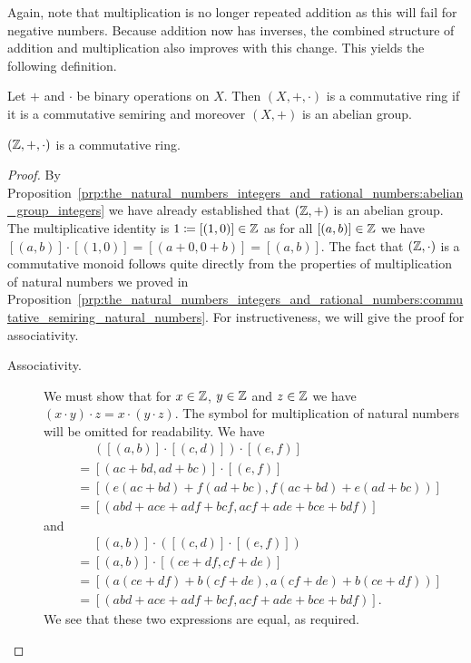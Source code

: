 \documentclass[../main.tex]{subfiles}
\begin{document}
Again, note that multiplication is no longer repeated addition as this will fail for negative numbers. Because addition now has inverses, the combined structure of addition and multiplication also improves with this change. This yields the following definition.
\begin{definition}
    Let $+$ and $\cdot$ be binary operations on $X$. Then $(X,+,\cdot)$ is a commutative ring if it is a commutative semiring and moreover $(X,+)$ is an abelian group.
\end{definition}
\begin{proposition}\label{prp:the_natural_numbers_integers_and_rational_numbers:commutative_ring_integers}
    $(\mathbb{Z},+,\cdot)$ is a commutative ring.
\end{proposition}
\begin{proof}
    By Proposition~\ref{prp:the_natural_numbers_integers_and_rational_numbers:abelian_group_integers} we have already established that $(\mathbb{Z},+)$ is an abelian group. The multiplicative identity is $1\coloneq[(1,0)]\in\mathbb{Z}$ as for all $[(a,b)]\in\mathbb{Z}$ we have $[(a,b)]\cdot[(1,0)]=[(a+0,0+b)]=[(a,b)]$. The fact that $(\mathbb{Z},\cdot)$ is a commutative monoid follows quite directly from the properties of multiplication of natural numbers we proved in Proposition~\ref{prp:the_natural_numbers_integers_and_rational_numbers:commutative_semiring_natural_numbers}. For instructiveness, we will give the proof for associativity.
    \begin{description}
        \item[Associativity.] We must show that for $x\in\mathbb{Z}$, $y\in\mathbb{Z}$ and $z\in\mathbb{Z}$ we have $(x\cdot y)\cdot z=x\cdot(y\cdot z)$. The symbol for multiplication of natural numbers will be omitted for readability. We have
        \begin{align*}
            & \phantom{{}={}}([(a,b)]\cdot[(c,d)])\cdot[(e,f)] \\
            & =[(ac+bd,ad+bc)]\cdot[(e,f)] \\
            & =[(e(ac+bd)+f(ad+bc),f(ac+bd)+e(ad+bc))] \\
            & =[(abd+ace+adf+bcf,acf+ade+bce+bdf)]
        \end{align*}
        and
        \begin{align*}
            & \phantom{{}={}}[(a,b)]\cdot([(c,d)]\cdot[(e,f)]) \\
            & =[(a,b)]\cdot[(ce+df,cf+de)] \\
            & =[(a(ce+df)+b(cf+de),a(cf+de)+b(ce+df))] \\
            & =[(abd+ace+adf+bcf,acf+ade+bce+bdf)].
        \end{align*}
        We see that these two expressions are equal, as required.
    \end{description}
\end{proof}
\end{document}
